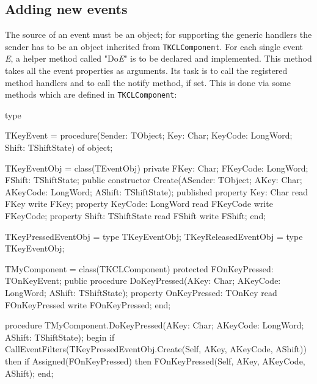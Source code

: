 \subsection{Adding new events}
The source of an event must be an object; for supporting the generic handlers
the sender has to be an object inherited from \texttt{TKCLComponent}.
For each single event \textit{E}, a helper method called "Do\textit{E}" is to
be declared and implemented. This method takes all the event properties as
arguments. Its task is to call the registered method handlers and to call the
notify method, if set.
This is done via some methods which are defined in \texttt{TKCLComponent}:
\small
\begin{listing}{1}
type

  TKeyEvent = procedure(Sender: TObject; Key: Char; KeyCode: LongWord;
    Shift: TShiftState) of object;

  TKeyEventObj = class(TEventObj)
  private
    FKey: Char;
    FKeyCode: LongWord;
    FShift: TShiftState;
  public
    constructor Create(ASender: TObject; AKey: Char;
      AKeyCode: LongWord; AShift: TShiftState);
  published
    property Key: Char read FKey write FKey;
    property KeyCode: LongWord read FKeyCode write FKeyCode;
    property Shift: TShiftState read FShift write FShift;
  end;

  TKeyPressedEventObj = type TKeyEventObj;
  TKeyReleasedEventObj = type TKeyEventObj;

  TMyComponent = class(TKCLComponent)
  protected
    FOnKeyPressed: TOnKeyEvent;
  public
    procedure DoKeyPressed(AKey: Char; AKeyCode: LongWord;
      AShift: TShiftState);
    property OnKeyPressed: TOnKey read FOnKeyPressed
      write FOnKeyPressed;
  end;

procedure TMyComponent.DoKeyPressed(AKey: Char; AKeyCode: LongWord;
                                    AShift: TShiftState);
begin
  if CallEventFilters(TKeyPressedEventObj.Create(Self, AKey,
    AKeyCode, AShift)) then
    if Assigned(FOnKeyPressed) then
      FOnKeyPressed(Self, AKey, AKeyCode, AShift);
end;
\end{listing}
\normalsize

